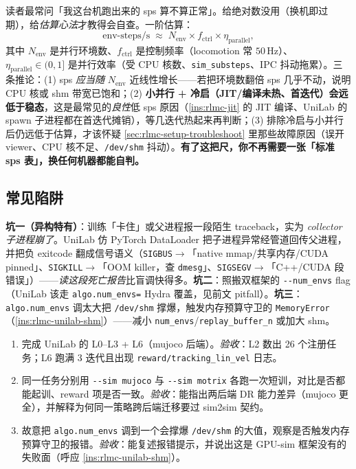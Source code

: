 \begin{insight}\label{ins:rlmc-throughput-sanity}
读者最常问「我这台机跑出来的 sps 算不算正常」。给绝对数没用（换机即过期），给\emph{估算心法}才教得会自查。一阶估算：\[\text{env-steps/s}\;\approx\;N_{\text{env}}\times f_{\text{ctrl}}\times \eta_{\text{parallel}},\]其中 $N_{\text{env}}$ 是并行环境数、$f_{\text{ctrl}}$ 是控制频率（locomotion 常 $50\,$Hz）、$\eta_{\text{parallel}}\in(0,1]$ 是并行效率（受 CPU 核数、\verb|sim_substeps|、IPC 抖动拖累）。三条推论：(1) sps \emph{应当随} $N_{\text{env}}$ 近线性增长——若把环境数翻倍 sps 几乎不动，说明 CPU 核或 shm 带宽已饱和；(2) \textbf{小并行 + 冷启（JIT/编译未热、首迭代）会远低于稳态}，这是最常见的\emph{良性}低 sps 原因（\cref{ins:rlmc-jit} 的 JIT 编译、UniLab 的 spawn 子进程都在首迭代摊销），等几迭代热起来再判断；(3) 排除冷启与小并行后仍远低于估算，才该怀疑 \cref{sec:rlmc-setup-troubleshoot} 里那些故障原因（误开 viewer、CPU 核不足、\verb|/dev/shm| 抖动）。\textbf{有了这把尺，你不再需要一张「标准 sps 表」，换任何机器都能自判。}
\end{insight}

\subsection{常见陷阱}

\begin{pitfall}
\textbf{坑一（异构特有）}：训练「卡住」或父进程报一段陌生 traceback，实为 \emph{collector 子进程崩了}。UniLab 仿 PyTorch DataLoader 把子进程异常经管道回传父进程，并把负 exitcode 翻成信号语义（\verb|SIGBUS|$\to$「native mmap/共享内存/CUDA pinned」、\verb|SIGKILL|$\to$「OOM killer，查 \texttt{dmesg}」、\verb|SIGSEGV|$\to$「C++/CUDA 段错误」）——\emph{读这段死亡报告}比盲调快得多。\textbf{坑二}：照搬双框架的 \verb|--num_envs| flag（UniLab 该走 \verb|algo.num_envs=| Hydra 覆盖，见前文 pitfall）。\textbf{坑三}：\verb|algo.num_envs| 调太大把 \verb|/dev/shm| 撑爆，触发内存预算守卫的 \verb|MemoryError|（\cref{ins:rlmc-unilab-shm}）——减小 \verb|num_envs|/\verb|replay_buffer_n| 或加大 shm。
\end{pitfall}

\begin{practice}
\begin{enumerate}
  \item 完成 UniLab 的 L0--L3 + L6（mujoco 后端）。\emph{验收}：L2 数出 26 个注册任务；L6 跑满 3 迭代且出现 \verb|reward/tracking_lin_vel| 日志。
  \item 同一任务分别用 \verb|--sim mujoco| 与 \verb|--sim motrix| 各跑一次短训，对比是否都能起训、reward 项是否一致。\emph{验收}：能指出两后端 DR 能力差异（mujoco 更全），并解释为何同一策略跨后端迁移要过 sim2sim 契约。
  \item 故意把 \verb|algo.num_envs| 调到一个会撑爆 \verb|/dev/shm| 的大值，观察是否触发内存预算守卫的报错。\emph{验收}：能复述报错提示，并说出这是 GPU-sim 框架没有的失败面（呼应 \cref{ins:rlmc-unilab-shm}）。
\end{enumerate}
\end{practice}

